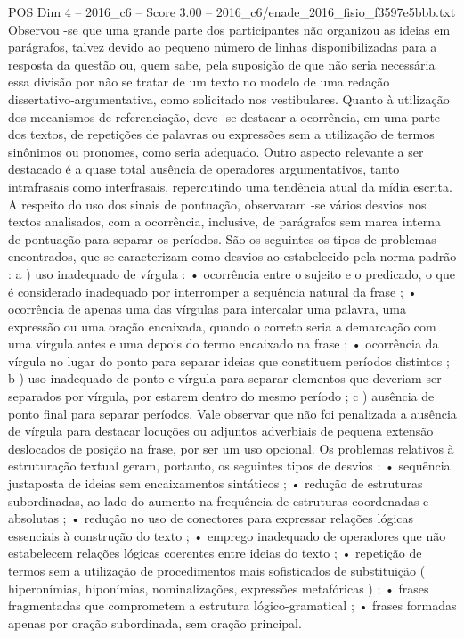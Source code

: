 \begin{textsample}{POS Dim 4 – 2016\_c6 – Score 3.00 – 2016\_c6/enade\_2016\_fisio\_f3597e5bbb.txt}
Observou -se que uma grande parte dos participantes não organizou as ideias em parágrafos, talvez devido ao pequeno número de linhas disponibilizadas para a resposta da questão ou, quem sabe, pela suposição de que não seria necessária essa divisão por não se tratar de um texto no modelo de uma redação dissertativo-argumentativa, como solicitado nos vestibulares.
Quanto à utilização dos mecanismos de referenciação, deve -se destacar a ocorrência, em uma parte dos textos, de repetições de palavras ou expressões sem a utilização de termos sinônimos ou pronomes, como seria adequado.
Outro aspecto relevante a ser destacado é a quase total ausência de operadores argumentativos, tanto intrafrasais como interfrasais, repercutindo uma tendência atual da mídia escrita.
A respeito do uso dos sinais de pontuação, observaram -se vários desvios nos textos analisados, com a ocorrência, inclusive, de parágrafos sem marca interna de pontuação para separar os períodos.
São os seguintes os tipos de problemas encontrados, que se caracterizam como desvios ao estabelecido pela norma-padrão : a ) uso inadequado de vírgula : • ocorrência entre o sujeito e o predicado, o que é considerado inadequado por interromper a sequência natural da frase ; • ocorrência de apenas uma das vírgulas para intercalar uma palavra, uma expressão ou uma oração encaixada, quando o correto seria a demarcação com uma vírgula antes e uma depois do termo encaixado na frase ; • ocorrência da vírgula no lugar do ponto para separar ideias que constituem períodos distintos ; b ) uso inadequado de ponto e vírgula para separar elementos que deveriam ser separados por vírgula, por estarem dentro do mesmo período ; c ) ausência de ponto final para separar períodos.
Vale observar que não foi penalizada a ausência de vírgula para destacar locuções ou adjuntos adverbiais de pequena extensão deslocados de posição na frase, por ser um uso opcional.
Os problemas relativos à estruturação textual geram, portanto, os seguintes tipos de desvios : • sequência justaposta de ideias sem encaixamentos sintáticos ; • redução de estruturas subordinadas, ao lado do aumento na frequência de estruturas coordenadas e absolutas ; • redução no uso de conectores para expressar relações lógicas essenciais à construção do texto ; • emprego inadequado de operadores que não estabelecem relações lógicas coerentes entre ideias do texto ; • repetição de termos sem a utilização de procedimentos mais sofisticados de substituição ( hiperonímias, hiponímias, nominalizações, expressões metafóricas ) ; • frases fragmentadas que comprometem a estrutura lógico-gramatical ; • frases formadas apenas por oração subordinada, sem oração principal.

\end{textsample}
